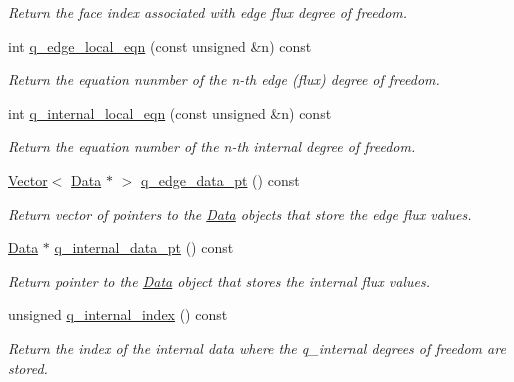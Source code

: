 \begin{DoxyCompactItemize}
\begin{DoxyCompactList}\small\item\em Return the face index associated with edge flux degree of freedom. \end{DoxyCompactList}\item 
int \hyperlink{classoomph_1_1TRaviartThomasDarcyElement_ac2ff2f6ee57c888dbeac1a9e7b7efc61}{q\+\_\+edge\+\_\+local\+\_\+eqn} (const unsigned \&n) const
\begin{DoxyCompactList}\small\item\em Return the equation nunmber of the n-\/th edge (flux) degree of freedom. \end{DoxyCompactList}\item 
int \hyperlink{classoomph_1_1TRaviartThomasDarcyElement_a9c2b450d0dc3ce6a683409f2e82b8589}{q\+\_\+internal\+\_\+local\+\_\+eqn} (const unsigned \&n) const
\begin{DoxyCompactList}\small\item\em Return the equation number of the n-\/th internal degree of freedom. \end{DoxyCompactList}\item 
\hyperlink{classoomph_1_1Vector}{Vector}$<$ \hyperlink{classoomph_1_1Data}{Data} $\ast$ $>$ \hyperlink{classoomph_1_1TRaviartThomasDarcyElement_ac58734e7ac988c4eabc80f3352d613a6}{q\+\_\+edge\+\_\+data\+\_\+pt} () const
\begin{DoxyCompactList}\small\item\em Return vector of pointers to the \hyperlink{classoomph_1_1Data}{Data} objects that store the edge flux values. \end{DoxyCompactList}\item 
\hyperlink{classoomph_1_1Data}{Data} $\ast$ \hyperlink{classoomph_1_1TRaviartThomasDarcyElement_a3ee981ece6c2ac5a61a1fc5c75159496}{q\+\_\+internal\+\_\+data\+\_\+pt} () const
\begin{DoxyCompactList}\small\item\em Return pointer to the \hyperlink{classoomph_1_1Data}{Data} object that stores the internal flux values. \end{DoxyCompactList}\item 
unsigned \hyperlink{classoomph_1_1TRaviartThomasDarcyElement_aabea3c06ebef3cc39e7eb25e5833ae84}{q\+\_\+internal\+\_\+index} () const
\begin{DoxyCompactList}\small\item\em Return the index of the internal data where the q\+\_\+internal degrees of freedom are stored. \end{DoxyCompactList}\item 

\end{DoxyCompactItemize}
